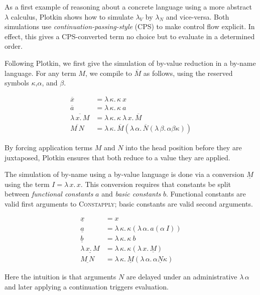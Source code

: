 \documentclass{article}
\begin{document}
As a first example of reasoning about a concrete language using a more abstract $\lambda$ calculus, Plotkin shows how to simulate $\lambda_V$ by $\lambda_N$ and vice-versa.
Both simulations use \emph{continuation-passing-style} (CPS) to make control flow explicit.
In effect, this gives a CPS-converted term no choice but to evaluate in a determined order.

Following Plotkin, we first give the simulation of by-value reduction in a by-name language.
For any term $M$, we compile to $\overline{M}$ as follows, using the reserved symbols $\kappa$,$\alpha$, and $\beta$.

\begin{align*}
  \overline{x} &= \lambda\,\kappa.\,\kappa~x
\\\overline{a} &= \lambda\,\kappa.\,\kappa~a
\\\overline{\lambda\,x.\,M} &= \lambda\,\kappa.\,\kappa~\lambda\,x.\,\overline{M}
\\\overline{M~N} &= \lambda\,\kappa.\,\overline{M}(\lambda\,\alpha.\,\overline{N}(\lambda\,\beta.\,\alpha\beta\kappa))
\end{align*}

By forcing application terms $M$ and $N$ into the head position before they are juxtaposed, Plotkin ensures that both reduce to a value they are applied.

The simulation of by-name using a by-value language is done via a conversion $\underline{M}$ using the term $I = \lambda\,x.\,x$.
This conversion requires that constants be split between \emph{functional constants} $a$ and \emph{basic constants} $b$.
Functional constants are valid first arguments to \textsc{Constapply}; basic constants are valid second arguments.

\begin{align*}
  \underline{x} &= x
\\\underline{a} &= \lambda\,\kappa.\,\kappa(\lambda\,\alpha.\,a(\alpha~I))
\\\underline{b} &= \lambda\,\kappa.\,\kappa~b
\\\underline{\lambda\,x.\,M} &= \lambda\,\kappa.\,\kappa(\lambda\,x.\,\underline{M})
\\\underline{M~N} &= \lambda\,\kappa.\,\underline{M}(\lambda\,\alpha.\,\alpha\underline{N}\kappa)
\end{align*}

Here the intuition is that arguments $N$ are delayed under an administrative $\lambda\,\alpha$ and later applying a continuation triggers evaluation.
\end{document}
